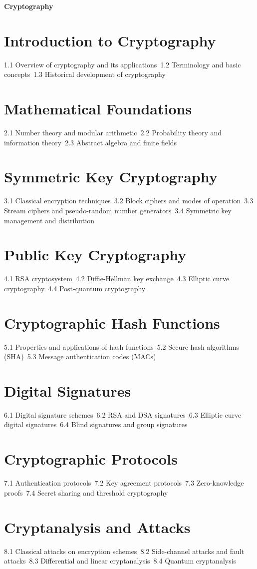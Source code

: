 {\LARGE \bf{Cryptography}}
\section{Introduction to Cryptography}
1.1 Overview of cryptography and its applications\
1.2 Terminology and basic concepts\
1.3 Historical development of cryptography\
\section{Mathematical Foundations}
2.1 Number theory and modular arithmetic\
2.2 Probability theory and information theory\
2.3 Abstract algebra and finite fields\
\section{Symmetric Key Cryptography}
3.1 Classical encryption techniques\
3.2 Block ciphers and modes of operation\
3.3 Stream ciphers and pseudo-random number generators\
3.4 Symmetric key management and distribution\
\section{Public Key Cryptography}
4.1 RSA cryptosystem\
4.2 Diffie-Hellman key exchange\
4.3 Elliptic curve cryptography\
4.4 Post-quantum cryptography\
\section{Cryptographic Hash Functions}
5.1 Properties and applications of hash functions\
5.2 Secure hash algorithms (SHA)\
5.3 Message authentication codes (MACs)\
\section{Digital Signatures}
6.1 Digital signature schemes\
6.2 RSA and DSA signatures\
6.3 Elliptic curve digital signatures\
6.4 Blind signatures and group signatures\
\section{Cryptographic Protocols}
7.1 Authentication protocols\
7.2 Key agreement protocols\
7.3 Zero-knowledge proofs\
7.4 Secret sharing and threshold cryptography\
\section{Cryptanalysis and Attacks}
8.1 Classical attacks on encryption schemes\
8.2 Side-channel attacks and fault attacks\
8.3 Differential and linear cryptanalysis\
8.4 Quantum cryptanalysis\
